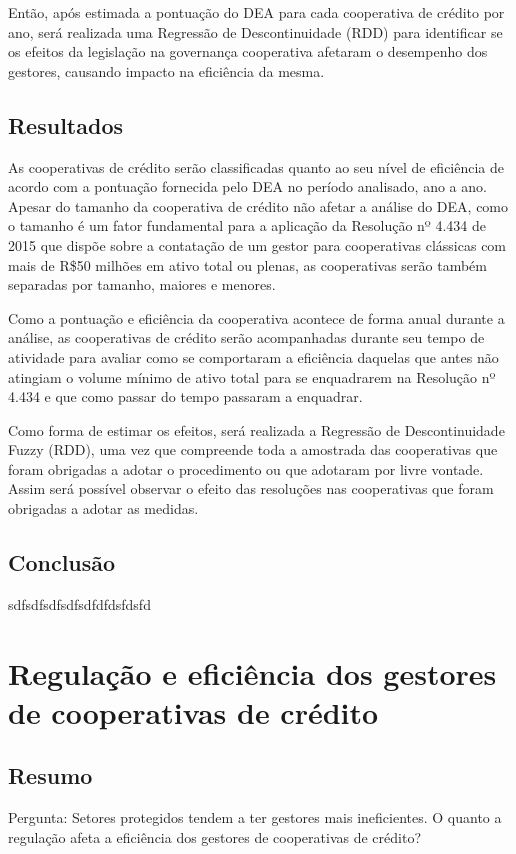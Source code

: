 \documentclass[ppgcc]{fearp}
\begin{document}
Então, após estimada a pontuação do DEA para cada cooperativa de crédito por ano, será realizada uma Regressão de Descontinuidade (RDD) para identificar se os efeitos da legislação na governança cooperativa afetaram o desempenho dos gestores, causando impacto na eficiência da mesma.

\section{Resultados}

As cooperativas de crédito serão classificadas quanto ao seu nível de eficiência de acordo com a pontuação fornecida pelo DEA no período analisado, ano a ano. Apesar do tamanho da cooperativa de crédito não afetar a análise do DEA, como o tamanho é um fator fundamental para a aplicação da Resolução nº 4.434 de 2015 que dispõe sobre a contatação de um gestor para cooperativas clássicas com mais de R\$50 milhões em ativo total ou plenas, as cooperativas serão também separadas por tamanho, maiores e menores. 

Como a pontuação e eficiência da cooperativa acontece de forma anual durante a análise, as cooperativas de crédito serão acompanhadas durante seu tempo de atividade para avaliar como se comportaram a eficiência daquelas que antes não atingiam o volume mínimo de ativo total para se enquadrarem na Resolução nº 4.434 e que como passar do tempo passaram a enquadrar.

Como forma de estimar os efeitos, será realizada a Regressão de Descontinuidade Fuzzy (RDD), uma vez que compreende toda a amostrada das cooperativas que foram obrigadas a adotar o procedimento ou que adotaram por livre vontade. Assim será possível observar o efeito das resoluções nas cooperativas que foram obrigadas a adotar as medidas.


\section{Conclusão}

sdfsdfsdfsdfsdfdfdsfdsfd




\chapter{Regulação e eficiência dos gestores de cooperativas de crédito}

\section{Resumo}
Pergunta: Setores protegidos tendem a ter gestores mais ineficientes. O quanto a regulação afeta a eficiência dos gestores de cooperativas de crédito?
\end{document}
